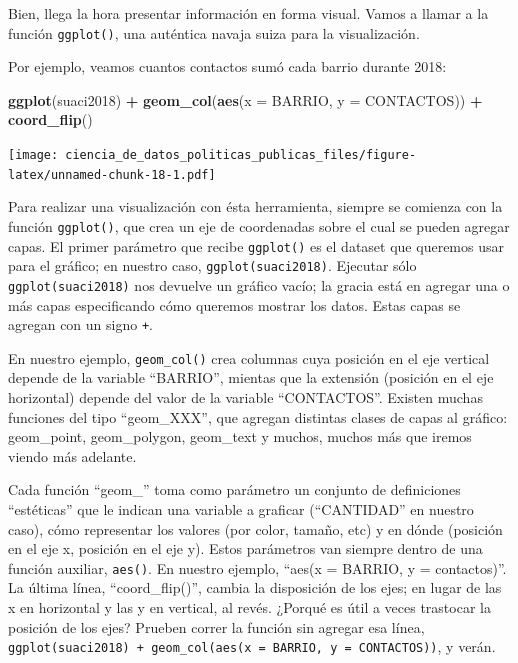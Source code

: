 \documentclass[]{book}
\newenvironment{Shaded}{\begin{snugshade}}{\end{snugshade}}
\newcommand{\KeywordTok}[1]{\textcolor[rgb]{0.13,0.29,0.53}{\textbf{#1}}}
\newcommand{\DataTypeTok}[1]{\textcolor[rgb]{0.13,0.29,0.53}{#1}}
\newcommand{\StringTok}[1]{\textcolor[rgb]{0.31,0.60,0.02}{#1}}
\newcommand{\OperatorTok}[1]{\textcolor[rgb]{0.81,0.36,0.00}{\textbf{#1}}}
\newcommand{\NormalTok}[1]{#1}
\begin{document}
Bien, llega la hora presentar información en forma visual. Vamos a
llamar a la función \texttt{ggplot()}, una auténtica navaja suiza para
la visualización.

Por ejemplo, veamos cuantos contactos sumó cada barrio durante 2018:

\begin{Shaded}
\begin{Highlighting}[]
\KeywordTok{ggplot}\NormalTok{(suaci2018) }\OperatorTok{+}
\StringTok{    }\KeywordTok{geom_col}\NormalTok{(}\KeywordTok{aes}\NormalTok{(}\DataTypeTok{x =}\NormalTok{ BARRIO, }\DataTypeTok{y =}\NormalTok{ CONTACTOS)) }\OperatorTok{+}
\StringTok{    }\KeywordTok{coord_flip}\NormalTok{()}
\end{Highlighting}
\end{Shaded}

\texttt{[image: ciencia\_de\_datos\_politicas\_publicas\_files/figure-latex/unnamed-chunk-18-1.pdf]}

Para realizar una visualización con ésta herramienta, siempre se
comienza con la función \texttt{ggplot()}, que crea un eje de
coordenadas sobre el cual se pueden agregar capas. El primer parámetro
que recibe \texttt{ggplot()} es el dataset que queremos usar para el
gráfico; en nuestro caso, \texttt{ggplot(suaci2018)}. Ejecutar sólo
\texttt{ggplot(suaci2018)} nos devuelve un gráfico vacío; la gracia está
en agregar una o más capas especificando cómo queremos mostrar los
datos. Estas capas se agregan con un signo \texttt{+}.

En nuestro ejemplo, \texttt{geom\_col()} crea columnas cuya posición en
el eje vertical depende de la variable ``BARRIO'', mientas que la
extensión (posición en el eje horizontal) depende del valor de la
variable ``CONTACTOS''. Existen muchas funciones del tipo ``geom\_XXX'',
que agregan distintas clases de capas al gráfico: geom\_point,
geom\_polygon, geom\_text y muchos, muchos más que iremos viendo más
adelante.

Cada función ``geom\_'' toma como parámetro un conjunto de definiciones
``estéticas'' que le indican una variable a graficar (``CANTIDAD'' en
nuestro caso), cómo representar los valores (por color, tamaño, etc) y
en dónde (posición en el eje x, posición en el eje y). Estos parámetros
van siempre dentro de una función auxiliar, \texttt{aes()}. En nuestro
ejemplo, ``aes(x = BARRIO, y = contactos)''. La última línea,
``coord\_flip()'', cambia la disposición de los ejes; en lugar de las x
en horizontal y las y en vertical, al revés. ¿Porqué es útil a veces
trastocar la posición de los ejes? Prueben correr la función sin agregar
esa línea,
\texttt{ggplot(suaci2018)\ +\ geom\_col(aes(x\ =\ BARRIO,\ y\ =\ CONTACTOS))},
y verán.
\end{document}
